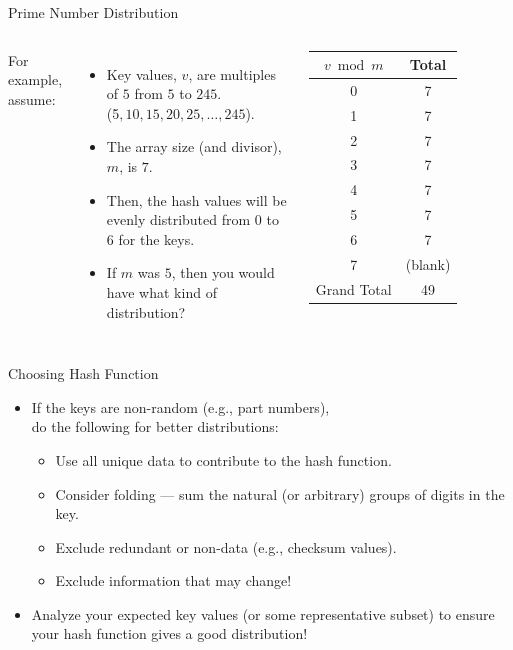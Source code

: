 \documentclass[14pt,aspectratio=1610]{beamer}
\begin{document}
\begin{frame}{Prime Number Distribution}
\begin{columns}[T]
For example, assume:
\begin{itemize}
  \item
    Key values, \(v\), are multiples of \(5\) from \(5\) to \(245\).\\
    (5\(, 10, 15, 20, 25, \ldots, 245\)).
  \item
    The array size (and divisor), \(m\), is \(7\).
  \item
    Then, the hash values will be evenly distributed from \(0\) to \(6\) for the keys.
  \item
    If \(m\) was \(5\), then you would have what kind of distribution?
\end{itemize}
%
\begin{table}\centering\small%
  \begin{tabular}{c c}%
  \toprule%
    \(v \bmod{} m\) & Total\\
  \midrule
    0  &  7\\
    1  &  7\\
    2  &  7\\
    3  &  7\\
    4  &  7\\
    5  &  7\\
    6  &  7\\
    7  &  (blank) \\
  \midrule
    Grand Total & 49\\
  \bottomrule
  \end{tabular}
\end{table}
\end{columns}
\end{frame}


\begin{frame}{Choosing Hash Function}
\begin{itemize}
  \item
    If the keys are non-random (e.g., part numbers), \\
    do the following for better distributions:
    \begin{itemize}
    \item
      Use all unique data to contribute to the hash function.
    \item
      Consider folding --- sum the natural (or arbitrary) groups of digits in the key.
    \item
      Exclude redundant or non-data (e.g., checksum values).
    \item
      Exclude information that may change!
    \end{itemize}
  \item
    Analyze your expected key values (or some representative subset) to ensure your hash function gives a good distribution!
\end{itemize}
\end{frame}
\end{document}
